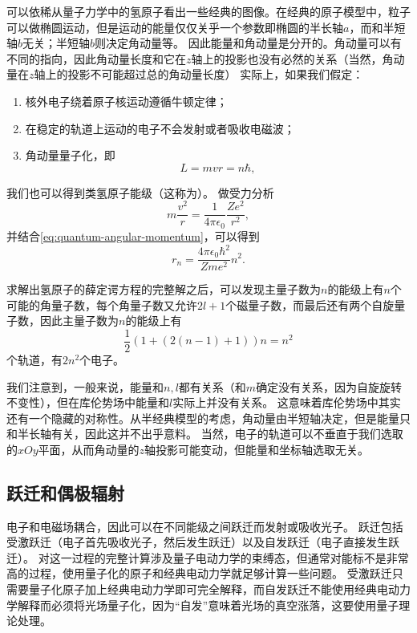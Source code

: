 可以依稀从量子力学中的氢原子看出一些经典的图像。在经典的原子模型中，粒子可以做椭圆运动，但是运动的能量仅仅关乎一个参数即椭圆的半长轴$a$，而和半短轴$b$无关；半短轴$b$则决定角动量等。
因此能量和角动量是分开的。角动量可以有不同的指向，因此角动量长度和它在$z$轴上的投影也没有必然的关系（当然，角动量在$z$轴上的投影不可能超过总的角动量长度）
实际上，如果我们假定：
\begin{enumerate}
    \item 核外电子绕着原子核运动遵循牛顿定律；
    \item 在稳定的轨道上运动的电子不会发射或者吸收电磁波；
    \item 角动量量子化，即
    \begin{equation}
        L = m v r = n \hbar,
        \label{eq:quantum-angular-momentum}
    \end{equation}
\end{enumerate}
我们也可以得到类氢原子能级（这称为）。
做受力分析
\[
    m \frac{v^2}{r} = \frac{1}{4\pi \epsilon_0} \frac{Z e^2}{r^2},
\]
并结合\eqref{eq:quantum-angular-momentum}，可以得到
\begin{equation}
    r_n = \frac{4\pi \epsilon_0 \hbar^2}{Zme^2} n^2.
\end{equation}

求解出氢原子的薛定谔方程的完整解之后，可以发现主量子数为$n$的能级上有$n$个可能的角量子数，每个角量子数又允许$2l+1$个磁量子数，而最后还有两个自旋量子数，因此主量子数为$n$的能级上有
\[
    \frac{1}{2} (1 + (2(n-1)+1)) n = n^2
\]
个轨道，有$2n^2$个电子。

我们注意到，一般来说，能量和$n, l$都有关系（和$m$确定没有关系，因为自旋旋转不变性），但在库伦势场中能量和$l$实际上并没有关系。
这意味着库伦势场中其实还有一个隐藏的对称性。从半经典模型的考虑，角动量由半短轴决定，但是能量只和半长轴有关，因此这并不出乎意料。
当然，电子的轨道可以不垂直于我们选取的$xOy$平面，从而角动量的$z$轴投影可能变动，但能量和坐标轴选取无关。

\subsection{跃迁和偶极辐射}\label{sec:electro-dipole}

电子和电磁场耦合，因此可以在不同能级之间跃迁而发射或吸收光子。
跃迁包括受激跃迁（电子首先吸收光子，然后发生跃迁）以及自发跃迁（电子直接发生跃迁）。
对这一过程的完整计算涉及量子电动力学的束缚态，但通常对能标不是非常高的过程，使用量子化的原子和经典电动力学就足够计算一些问题。
受激跃迁只需要量子化原子加上经典电动力学即可完全解释，而自发跃迁不能使用经典电动力学解释而必须将光场量子化，因为“自发”意味着光场的真空涨落，这要使用量子理论处理。

